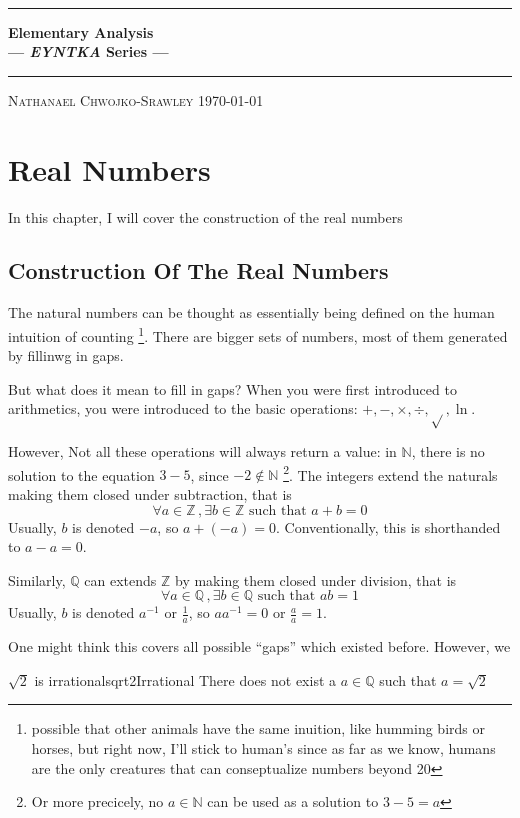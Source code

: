 \documentclass{book}
\def\title{Elementary Analysis}
\def\author{Nathanael Chwojko-Srawley}
\newlength{\drop}%
\newcommand*{\plogo}{\fbox{$\mathcal{PL}$}}
\newcommand{\titleUL}{\begingroup%
\drop=0.1\textheight
\vspace*{\drop}
\begin{center}
{\LARGE {\quad}}\\[\drop]

\rule{\textwidth}{1pt}\par
\vspace{0.5\baselineskip}
{\huge\bfseries \title\\[0.2\baselineskip]
\large --- \emph{EYNTKA} Series ---}\\[0.5\baselineskip]
\rule{\textwidth}{1pt}\par
\vfill
{\Large\textsc{\author}}
\vfill
\vfill
{\large \today}
\end{center}
\endgroup}
\renewcommand{\maketitle}{\titleUL}
\newcommand{\N}{{\mathbb{N}}}
\newcommand{\Q}{{\mathbb{Q}}}
\newcommand{\Z}{{\mathbb{Z}}}
\begin{document}
\maketitle
\tableofcontents
\newpage

\chapter{Real Numbers}
In this chapter, I will cover the construction of the real numbers

\section{Construction Of The Real Numbers}

The natural numbers can be thought as essentially being defined on the human intuition of counting \footnote{possible
that other animals have the same inuition, like humming birds or horses, but right now, I'll stick to human's since as
far as we know, humans are the only creatures that can conseptualize numbers beyond 20}. There are bigger sets of
numbers, most of them generated by fillinwg in gaps.


But what does it mean to fill in gaps? When you were first introduced to arithmetics, you were introduced to the basic
operations: $+, -, \times, \div, \sqrt{}, \ln$.


However, Not all these operations will always return a value: in $\N$, there is no solution to the equation $3 - 5$, since $-2 \notin
\N$ \footnote{Or more precicely, no $a \in \N$ can be used as a solution to $3 - 5 = a$}. The integers extend the
naturals making them closed under subtraction, that is
\[
	\forall a \in \Z\,, \exists b \in \Z \text{ such that } a + b = 0
\]
Usually, $b$ is denoted $-a$, so $a + (-a) = 0$. Conventionally, this is shorthanded to $a -a = 0$.


Similarly, $\Q$ can extends $\Z$ by making them closed under division, that is
\[
	\forall a \in \Q\,, \exists b \in \Q \text{ such that } ab = 1
\]
Usually, $b$ is denoted $a^{-1}$ or $\frac{1}{a}$, so $aa^{-1} = 0$ or $\frac{a}{a} = 1$.

One might think this covers all possible ``gaps'' which existed before. However, we
\begin{prop}{$\sqrt{2}$ is irrational}{sqrt2Irrational}
	There does not exist a $a \in \Q$ such that $a = \sqrt{2}$
\end{prop}
\end{document}

